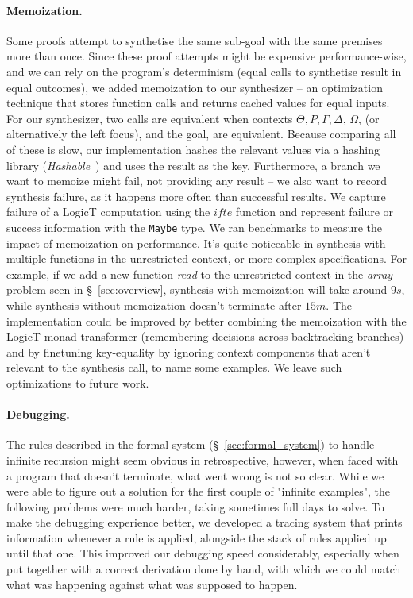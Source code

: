 \documentclass{llncs}
\newcommand{\mypara}[1]{\paragraph{\textbf{#1}.}}
\def\Rho{P}
\begin{document}
\mypara{Memoization} Some proofs attempt to synthetise the same
sub-goal with the same premises more than once. Since these proof
attempts might be expensive performance-wise, and we can rely on the
program's determinism (equal calls to synthetise result in equal
outcomes), we added memoization to our synthesizer -- an optimization
technique that stores function calls and returns cached values for
equal inputs.
%
For our synthesizer, two calls are equivalent when
contexts $\Theta, \Rho, \Gamma, \Delta$, $\Omega$, (or alternatively
the left focus), and the goal, are equivalent. Because comparing all
of these is slow, our implementation hashes the relevant values via a hashing
library (\emph{Hashable}~\cite{https://hackage.haskell.org/package/hashable}) and
uses the result as the key.
%
Furthermore, a branch we want to memoize
might fail, not providing any result -- we also want to record
synthesis failure, as it happens more often than successful
results. We capture failure of a LogicT computation using the $\mathit{ifte}$
function and represent failure or success information with the \texttt{Maybe}
type. We ran benchmarks to measure the impact of memoization on 
performance. It's quite noticeable in synthesis with multiple
functions in the unrestricted context, or more complex
specifications. For example, if we add a new function \emph{read} to
the unrestricted context in the \emph{array} problem seen in
\S~\ref{sec:overview}, synthesis with memoization will take
around $9s$, while synthesis without memoization doesn't terminate
after $15m$.
%
The implementation could be improved by better combining the
memoization with the LogicT monad transformer (remembering decisions across
backtracking branches) and by finetuning key-equality by ignoring context
components that aren't relevant to the synthesis call, to name some
examples. We leave such optimizations to future work.



\mypara{Debugging} The rules described in the formal
system (\S~\ref{sec:formal_system}) to handle infinite recursion might seem obvious in
retrospective, however, when faced with a program that doesn't terminate, what
went wrong is not so clear. While we were able to figure out a solution for the
first couple of "infinite examples", the following problems were much harder,
taking sometimes full days to solve. To make the debugging experience better, we
developed a tracing system that prints information whenever a rule is applied,
alongside the stack of rules applied up until that one. This improved our
debugging speed considerably, especially when put together with a correct
derivation done by hand, with which we could match what was happening against
what was supposed to happen.
\end{document}
